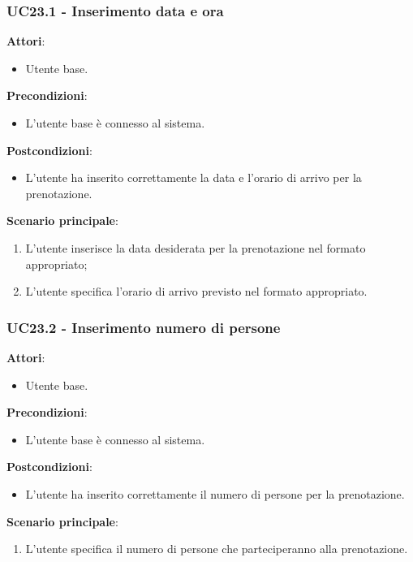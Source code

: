 \subsubsection{UC23.1 - Inserimento data e ora}\label{usecase:23_1}
\textbf{Attori}:
\begin{itemize}
    \item Utente base.
\end{itemize}
\textbf{Precondizioni}:
\begin{itemize}
    \item L'utente base è connesso al sistema.
\end{itemize}
\textbf{Postcondizioni}:
\begin{itemize}
    \item L'utente ha inserito correttamente la data e l'orario di arrivo per la prenotazione.
\end{itemize}
\textbf{Scenario principale}:
\begin{enumerate}
    \item L'utente inserisce la data desiderata per la prenotazione nel formato appropriato;
    \item L'utente specifica l'orario di arrivo previsto nel formato appropriato.
\end{enumerate}



\subsubsection{UC23.2 - Inserimento numero di persone}\label{usecase:23_2}
\textbf{Attori}:
\begin{itemize}
    \item Utente base.
\end{itemize}
\textbf{Precondizioni}:
\begin{itemize}
    \item L'utente base è connesso al sistema.
\end{itemize}
\textbf{Postcondizioni}:
\begin{itemize}
    \item L'utente ha inserito correttamente il numero di persone per la prenotazione.
\end{itemize}
\textbf{Scenario principale}:
\begin{enumerate}
    \item L'utente specifica il numero di persone che parteciperanno alla prenotazione.
\end{enumerate}


